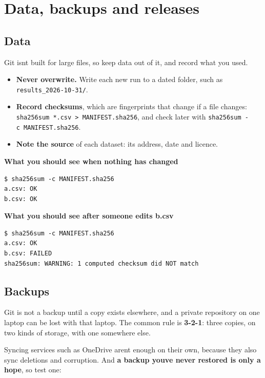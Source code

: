 \chapter{Data, backups and releases}
\label{ch:backups}

\section{Data}\label{data}

Git isn\textquotesingle t built for large files, so keep data out of it, and record what you used.

\begin{itemize}
\tightlist
\item
  \textbf{Never overwrite.} Write each new run to a dated folder, such as \texttt{results\_2026-10-31/}.
\item
  \textbf{Record checksums}, which are fingerprints that change if a file changes: \texttt{sha256sum\ *.csv\ \textgreater{}\ MANIFEST.sha256}, and check later with \texttt{sha256sum\ -c\ MANIFEST.sha256}.
\item
  \textbf{Note the source} of each dataset: its address, date and licence.
\end{itemize}

\textbf{What you should see when nothing has changed}

\begin{lstlisting}[language=text]
$ sha256sum -c MANIFEST.sha256
a.csv: OK
b.csv: OK
\end{lstlisting}

\textbf{What you should see after someone edits b.csv}

\begin{lstlisting}[language=text]
$ sha256sum -c MANIFEST.sha256
a.csv: OK
b.csv: FAILED
sha256sum: WARNING: 1 computed checksum did NOT match
\end{lstlisting}

\section{Backups}\label{backups}

Git is not a backup until a copy exists elsewhere, and a private repository on one laptop can be lost with that laptop. The common rule is \textbf{3-2-1}: three copies, on two kinds of storage, with one somewhere else.

Syncing services such as OneDrive aren\textquotesingle t enough on their own, because they also sync deletions and corruption. And \textbf{a backup you\textquotesingle ve never restored is only a hope}, so test one:

